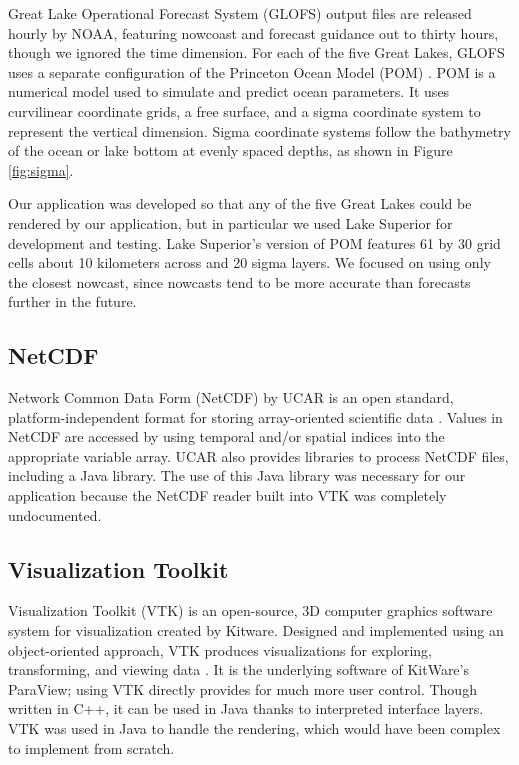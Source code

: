 \documentclass{article} %
\begin{document}
Great Lake Operational Forecast System (GLOFS) output files are released hourly by NOAA, featuring nowcoast and forecast guidance out to thirty hours, though we ignored the time dimension.  For each of the five Great Lakes, GLOFS uses a separate configuration of the Princeton Ocean Model (POM) \cite{pom}.  POM is a numerical model used to simulate and predict ocean parameters.  It uses curvilinear coordinate grids, a free surface, and a sigma coordinate system to represent the vertical dimension.  Sigma coordinate systems follow the bathymetry of the ocean or lake bottom at evenly spaced depths, as shown in Figure \ref{fig:sigma}.

Our application was developed so that any of the five Great Lakes could be rendered by our application, but in particular we used Lake Superior for development and testing.  Lake Superior's version of POM features 61 by 30 grid cells about 10 kilometers across and 20 sigma layers.  We focused on using only the closest nowcast, since nowcasts tend to be more accurate than forecasts further in the future.

\subsection{NetCDF}

Network Common Data Form (NetCDF) by UCAR is an open standard, platform-independent format for storing array-oriented scientific data \cite{netcdf}.  Values in NetCDF are accessed by using temporal and/or spatial indices into the appropriate variable array.  UCAR also provides libraries to process NetCDF files, including a Java library.  The use of this Java library was necessary for our application because the NetCDF reader built into VTK was completely undocumented.

\subsection{Visualization Toolkit}

Visualization Toolkit (VTK) is an open-source, 3D computer graphics software system for visualization created by Kitware.  Designed and implemented using an object-oriented approach, VTK produces visualizations for exploring, transforming, and viewing data \cite[p. 5]{vtkGuide}.  It is the underlying software of KitWare's ParaView; using VTK directly provides for much more user control.  Though written in C++, it can be used in Java thanks to interpreted interface layers.  VTK was used in Java to handle the rendering, which would have been complex to implement from scratch.
\end{document}
